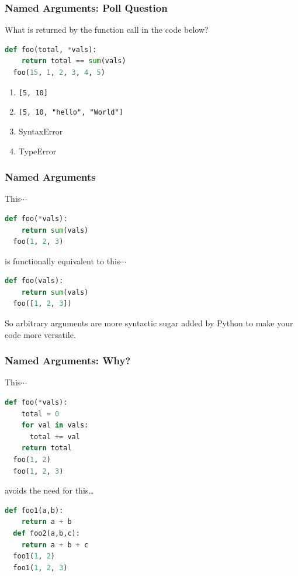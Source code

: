\documentclass{beamer}
\begin{document}
%
%
\begin{frame}[fragile]
  \frametitle{Named Arguments: Poll Question}
  What is returned by the function call in the code below?
  \begin{lstlisting}[language=Python, autogobble]
  def foo(total, *vals):
    return total == sum(vals)
  foo(15, 1, 2, 3, 4, 5)
  \end{lstlisting}
  \vfill
  \begin{enumerate}[A]
    \item \lstinline|[5, 10]|
    \item \lstinline|[5, 10, "hello", "World"]|
    \item SyntaxError
    \item TypeError
  \end{enumerate}
\end{frame}

%
%
\begin{frame}[fragile]
  \frametitle{Named Arguments}
  This$\cdots$
  \vfill
  \begin{lstlisting}[language=Python, autogobble]
  def foo(*vals):
    return sum(vals)
  foo(1, 2, 3)
  \end{lstlisting}
  \vfill
  is functionally equivalent to this$\cdots$
  \vfill
  \begin{lstlisting}[language=Python, autogobble]
  def foo(vals):
    return sum(vals)
  foo([1, 2, 3])
  \end{lstlisting}
  \vfill
  So arbitrary arguments are more syntactic sugar added by Python to make your code more versatile.
\end{frame}

%
%
\begin{frame}[fragile]
  \frametitle{Named Arguments: Why?}
  This$\cdots$
  \vfill
  \begin{lstlisting}[language=Python, autogobble]
  def foo(*vals):
    total = 0
    for val in vals:
      total += val
    return total
  foo(1, 2)
  foo(1, 2, 3)
  \end{lstlisting}
  \vfill
  avoids the need for this\dots
  \vfill
  \begin{lstlisting}[language=Python, autogobble]
  def foo1(a,b):
    return a + b 
  def foo2(a,b,c):
    return a + b + c
  foo1(1, 2)
  foo1(1, 2, 3)
  \end{lstlisting}
  \vfill
\end{frame}
\end{document}
